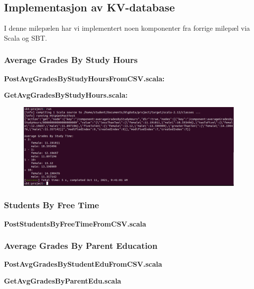 \subsection{Implementasjon av KV-database}
I denne milepælen har vi implementert noen komponenter fra forrige milepæl via Scala og SBT.

\subsubsection{Average Grades By Study Hours}
\textbf{PostAvgGradesByStudyHoursFromCSV.scala:}\\

\textbf{GetAvgGradesByStudyHours.scala:}\\

\FigureCounter
\begin{figure}[H]
  \centering
  \includegraphics[width=\textwidth]{images/milepael3/GetAvgGradesByStudyHoursTerminal.png}
\end{figure}

\subsubsection{Students By Free Time}
\textbf{PostStudentsByFreeTimeFromCSV.scala}\\

\subsubsection{Average Grades By Parent Education}
\textbf{PostAvgGradesByStudentEduFromCSV.scala}\\

\textbf{GetAvgGradesByParentEdu.scala}\\

